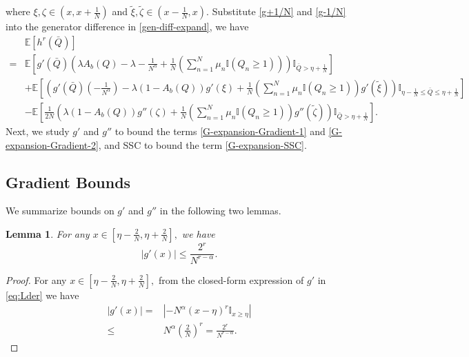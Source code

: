 \documentclass[11pt,oneside,letter]{article}
\newtheorem{lemma}{Lemma}
\begin{document}
where $\xi, \zeta \in (x,x+\frac{1}{N})$ and $\tilde{\xi}, \tilde{\zeta} \in (x-\frac{1}{N},x).$
Substitute \eqref{g+1/N} and \eqref{g-1/N} into the generator difference in \eqref{gen-diff-expand}, we have
\begin{align}
&\mathbb{E}\left[h^r\left(\bar Q\right)\right]\nonumber\\
= &\mathbb{E}\left[g'\left(\bar Q\right)\left(\lambda A_b(Q)- \lambda-\frac{1}{N^{\alpha}}+\frac{1}{N}\left(\sum_{n=1}^{N} \mu_n \mathbb{I}(Q_n\geq 1)\right) \right)\mathbb{I}_{\bar Q> \eta +\frac{1}{N}}\right] \label{G-expansion-SSC}\\
&+\mathbb{E}\left[\left(g'\left(\bar Q\right)\left(-\frac{1}{N^{\alpha}}\right)-\lambda(1-A_b(Q))g'(\xi) + \frac{1}{N}\left(\sum_{n=1}^{N} \mu_n \mathbb{I}(Q_n\geq 1)\right)g'(\tilde{\xi})\right)\mathbb{I}_{\eta-\frac{1}{N} \leq \bar Q \leq \eta+\frac{1}{N}}\right] \label{G-expansion-Gradient-1}\\
&-\mathbb{E}\left[\frac{1}{2N}\left(\lambda(1-A_b(Q))g''(\zeta) + \frac{1}{N}\left(\sum_{n=1}^{N} \mu_n \mathbb{I}(Q_n\geq 1)\right)g''(\tilde{\zeta})\right)\mathbb{I}_{\bar Q > \eta+\frac{1}{N}}\right]. \label{G-expansion-Gradient-2}
\end{align}
Next, we study $g'$ and $g''$ to bound the terms \eqref{G-expansion-Gradient-1} and \eqref{G-expansion-Gradient-2}, and SSC to bound the term \eqref{G-expansion-SSC}.



\subsection{Gradient Bounds}
We summarize bounds on $g'$ and $g''$ in the following two lemmas.

\begin{lemma}\label{lemma:g'}
For any  $x\in\left[\eta -\frac{2}{N}, \eta  +\frac{2}{N}\right],$ we have $$|g'(x)|\leq \frac{2^r}{ N^{r-\alpha}}.$$
\end{lemma}
\begin{proof}
For any $x\in\left[\eta  -\frac{2}{N}, \eta +\frac{2}{N}\right],$ from the closed-form expression of  $g'$ in \eqref{eq:Lder} we have 
\begin{eqnarray*}
|g'(x)|=& \left|- N^{\alpha}\left(x-\eta\right)^{r} \mathbb{I}_{x\geq \eta} \right|\\
\leq& N^{\alpha}\left(\frac{2}{N}\right)^r=\frac{2^r}{N^{r - \alpha}}.    
\end{eqnarray*}
\end{proof}
\end{document}
